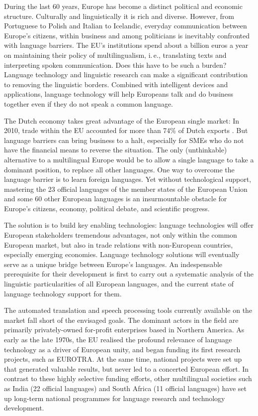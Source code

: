 \documentclass[]{../../metanetpaper}
\begin{document}
\begin{multicols}{2}

During the last 60 years, Europe has become a distinct political and economic structure. Culturally and linguistically it is rich and diverse. However, from Portuguese to Polish and Italian to Icelandic, everyday communication between Europe’s citizens, within business and among politicians is inevitably confronted with language barriers. The EU's institutions spend about a billion euros a year on maintaining their policy of multilingualism, i.\,e., translating texts and interpreting spoken communication. Does this have to be such a burden? Language technology and linguistic research can make a significant contribution to removing the linguistic borders. Combined with intelligent devices and applications, language technology will help Europeans talk and do business together even if they do not speak a common language.


 The Dutch economy takes great advantage of the European single market: In 2010, trade within the EU accounted for more than 74\% of Dutch exports \cite{CBSStats}. But language barriers can bring business to a halt, especially for SMEs who do not have the financial means to reverse the situation. The only (unthinkable) alternative to a multilingual Europe would be to allow a single language to take a dominant position, to replace all other languages.
One way to overcome the language barrier is to learn foreign languages. Yet without technological support, mastering the 23 official languages of the member states of the European Union and some 60 other European languages is an insurmountable obstacle for Europe’s citizens, economy, political debate, and scientific progress.

The solution is to build key enabling technologies: language technologies will offer European stakeholders tremendous advantages, not only within the common European market, but also in trade relations with non-European countries, especially emerging economies. Language technology solutions will eventually serve as a unique bridge between Europe's languages. An indespensable prerequisite for their development is first to carry out a systematic analysis of the linguistic particularities of all European languages, and the current state of language technology support for them.

The automated translation and speech processing tools currently available on the market fall short of the envisaged goals. The dominant actors in the field are primarily privately-owned for-profit enterprises based in Northern America. As early as the late 1970s, the EU realised the profound relevance of language technology as a driver of European unity, and began funding its first research projects, such as EUROTRA. At the same time, national projects were set up that generated valuable results, but never led to a concerted European effort. In contrast to these highly selective funding efforts, other multilingual societies such as India (22 official languages) and South Africa (11 official languages) have set up long-term national programmes for language research and technology development.


\end{multicols}
\end{document}
